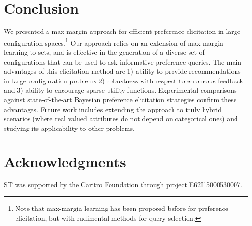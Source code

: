 \documentclass{article}
\renewcommand\[{\begin{equation}}
\renewcommand\]{\end{equation}}
\newcommand{\paolo}[1]{{\bf \textcolor{red}{{\fbox{Paolo:} #1}}}}
\begin{document}


\section{Conclusion}
\label{sec:conclusions}

We presented a max-margin approach for efficient preference
elicitation in large configuration spaces.\footnote{Note that max-margin learning has been proposed before \cite{gajos2005} for preference elicitation, 
but with  rudimental methods for query selection.}
Our approach relies on an
extension of max-margin learning to sets, and is effective in the
generation of a diverse set of configurations that can be used to ask
informative preference queries.  The main advantages of this
elicitation method are 1) ability to provide recommendations in large
configuration problems 2) robustness with respect to erroneous
feedback and 3) ability to encourage sparse utility functions.
Experimental comparisons against state-of-the-art Bayesian preference
elicitation strategies confirm these advantages. Future work includes
extending the approach to truly hybrid scenarios (where real valued
attributes do not depend on categorical ones) and studying its
applicability %
to other problems.


\section*{Acknowledgments}
ST was supported by the Caritro Foundation through project E62I15000530007.





\end{document}
